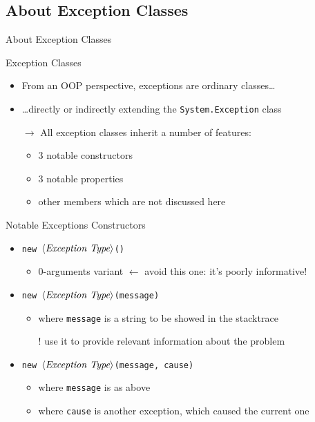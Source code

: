 \documentclass[presentation]{beamer}
\newcommand{\cscat}[1]{$\langle\text{{\itshape#1}}\rangle$}
\begin{document}
\subsection{About Exception Classes}

\begin{frame}[allowframebreaks]{About Exception Classes}
  \begin{block}{Exception Classes}
    \begin{itemize}
      \item From an OOP perspective, exceptions are ordinary \alert{classes}\ldots
      \item \ldots directly or indirectly extending the \alert{\texttt{System.Exception}} class
      \item[$\rightarrow$] All exception classes \alert{inherit} a number of features:
      \begin{itemize}
        \item 3 notable constructors
        \item 3 notable properties
        \item other members which are not discussed here
      \end{itemize} 
    \end{itemize}
  \end{block}
  
  \begin{exampleblock}{Notable Exceptions Constructors}
    \begin{itemize}
      \item \texttt{new \cscat{Exception Type}()}
      \begin{itemize}
        \item 0-arguments variant $\leftarrow$ \alert{avoid this one}: it's poorly informative! 
      \end{itemize}
      \item \texttt{new \cscat{Exception Type}(message)}
      \begin{itemize}
        \item where \texttt{message} is a \alert{string} to be showed in the stacktrace
        \item[!] use it to provide \alert{relevant} information about the problem
      \end{itemize}

      \item \texttt{new \cscat{Exception Type}(message, cause)}
      \begin{itemize}
        \item where \texttt{message} is as above
        \item where \texttt{cause} is \alert{another exception}, which caused the current one
      \end{itemize}
    \end{itemize}
  \end{exampleblock}


\end{frame}
\end{document}
